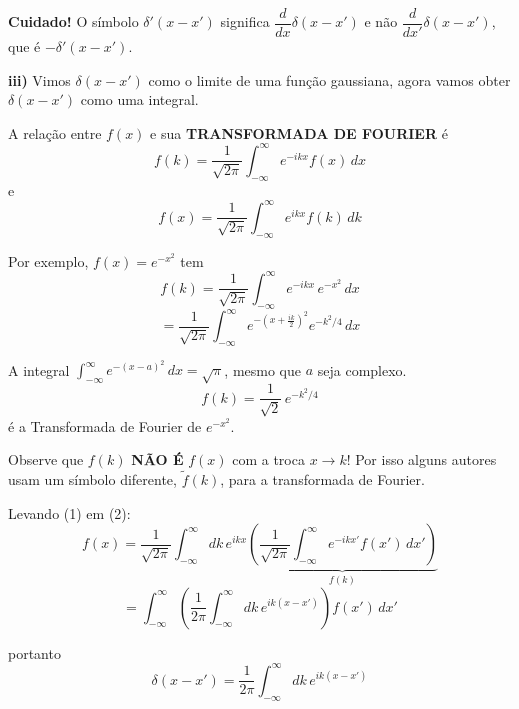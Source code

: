 \textbf{Cuidado!} O símbolo $\delta'(x-x')$ significa $\dfrac{d}{dx}\delta(x-x')$ e não $\dfrac{d}{dx'}\delta(x-x')$, que é $-\delta'(x-x')$.

\textbf{iii)} Vimos $\delta(x-x')$ como o limite de uma função gaussiana, agora vamos obter $\delta(x-x')$ como uma integral.

A relação entre $f(x)$ e sua \textbf{TRANSFORMADA DE FOURIER} é
\begin{equation}
    \label{eq:aula6_fourier_direta}
    f(k) = \frac{1}{\sqrt{2\pi}} \int_{-\infty}^{\infty} e^{-ikx} f(x)\, dx \tag{1}
\end{equation}
e
\begin{equation}
    \label{eq:aula6_fourier_inversa}
    f(x) = \frac{1}{\sqrt{2\pi}} \int_{-\infty}^{\infty} e^{ikx} f(k)\, dk \tag{2}
\end{equation}

Por exemplo, $f(x) = e^{-x^2}$ tem
\begin{equation}
    f(k) = \frac{1}{\sqrt{2\pi}} \int_{-\infty}^{\infty} e^{-ikx}\, e^{-x^2}\, dx
\end{equation}
\begin{equation}
    = \frac{1}{\sqrt{2\pi}} \int_{-\infty}^{\infty} e^{-\left(x+\frac{ik}{2}\right)^2} e^{-k^2/4}\, dx
\end{equation}

A integral $\displaystyle\int_{-\infty}^{\infty} e^{-(x-a)^2}\, dx = \sqrt{\pi}$, mesmo que $a$ seja complexo.
\begin{equation}
    f(k) = \frac{1}{\sqrt{2}}\, e^{-k^2/4}
\end{equation}
é a Transformada de Fourier de $e^{-x^2}$.

Observe que $f(k)$ \textbf{NÃO É} $f(x)$ com a troca $x \to k$! Por isso alguns autores usam um símbolo diferente, $\tilde{f}(k)$, para a transformada de Fourier.

Levando (1) em (2):
\begin{equation}
    f(x) = \frac{1}{\sqrt{2\pi}} \int_{-\infty}^{\infty} dk\, e^{ikx} \underbrace{\left(\frac{1}{\sqrt{2\pi}} \int_{-\infty}^{\infty} e^{-ikx'} f(x')\, dx'\right)}_{f(k)}
\end{equation}
\begin{equation}
    = \int_{-\infty}^{\infty} \left(\frac{1}{2\pi}\int_{-\infty}^{\infty} dk\, e^{ik(x-x')}\right) f(x')\, dx'
\end{equation}

portanto
\begin{equation}
    \label{eq:aula6_delta_fourier}
    \boxed{\delta(x-x') = \frac{1}{2\pi} \int_{-\infty}^{\infty} dk\, e^{ik(x-x')}}
\end{equation}
